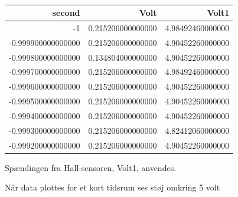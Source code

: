 \begin{table}[h]
  \centering
\begin{tabular}{r|r|r}
\hline
\textbf{second} & \textbf{Volt} & \textbf{Volt1} \\
\hline
-1 & 0.215206000000000 & 4.98492460000000 \\
-0.999900000000000 & 0.215206000000000 & 4.90452260000000 \\
-0.999800000000000 & 0.134804000000000 & 4.90452260000000 \\
-0.999700000000000 & 0.215206000000000 & 4.98492460000000 \\
-0.999600000000000 & 0.215206000000000 & 4.90452260000000 \\
-0.999500000000000 & 0.215206000000000 & 4.90452260000000 \\
-0.999400000000000 & 0.215206000000000 & 4.90452260000000 \\
-0.999300000000000 & 0.215206000000000 & 4.82412060000000 \\
-0.999200000000000 & 0.215206000000000 & 4.90452260000000 \\
\hline
\end{tabular}
  \caption{}
  \label{tab:komp3}
\end{table}

Spændingen fra Hall-sensoren, Volt1, anvendes.

Når data plottes for et kort tidsrum ses støj omkring 5 volt

